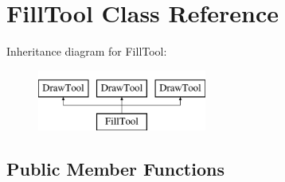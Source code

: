\hypertarget{classFillTool}{\section{Fill\-Tool Class Reference}
\label{classFillTool}
}
Inheritance diagram for Fill\-Tool\-:\begin{figure}[H]
\begin{center}
\leavevmode
\includegraphics[height=2.000000cm]{classFillTool}
\end{center}
\end{figure}
\subsection*{Public Member Functions}
